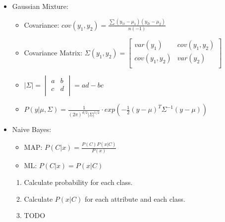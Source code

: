 \documentclass[twocolumn, 10pt]{article}
\begin{document}
\begin{itemize}[leftmargin=*, itemsep=0pt]
    \item Gaussian Mixture:
    \begin{itemize}[topsep=0pt]
        \item Covariance: $\displaystyle cov(y_1,y_2)=\frac{\sum(y_{1i}-\mu_1)(y_{2i}-\mu_2)}{n(-1)}$
        \item Covariance Matrix: $\Sigma(y_1,y_2)=
        \begin{bmatrix}
            var(y_1) & cov(y_1,y_2) \\
            cov(y_1,y_2) & var(y_2) \\
        \end{bmatrix}$
        \item $\left\lvert\Sigma\right\rvert=
        \begin{vmatrix}
            a & b \\
            c & d \\
        \end{vmatrix}
        = ad-bc$
        \item $\displaystyle P(y|\mu,\Sigma)=\frac{1}{(2\pi)^{d/2}|\Sigma|^{1/2}}\cdot exp\left(-\frac{1}{2}(y-\mu)^T\Sigma^{-1}(y-\mu)\right)$
    \end{itemize}

    \item Naive Bayes: 
    \begin{itemize}[topsep=0pt, itemsep=0pt]
        \item MAP: $\displaystyle P(C|x)=\frac{P(C)P(x|C)}{P(x)}$
        \item ML: $\displaystyle P(C|x)=P(x|C)$
    \end{itemize}
    \begin{enumerate}[topsep=0pt, itemsep=0pt]
        \item Calculate probability for each class.
        \item Calculate $P(x|C)$ for each attribute and each class.
        \item TODO
    \end{enumerate}
    

\end{itemize}
\end{document}
